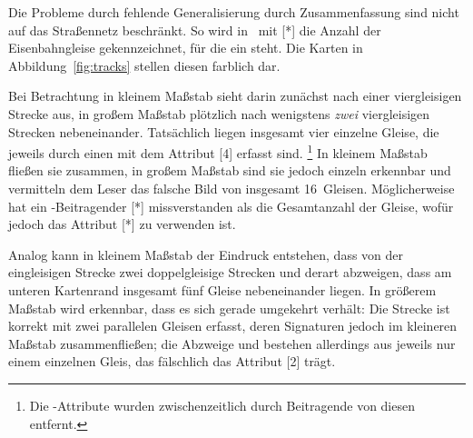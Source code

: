 \documentclass[../main/thesis.tex]{subfiles}
\begin{document}
\label{railway-case}

Die Probleme durch fehlende Generalisierung durch Zusammenfassung sind nicht auf das Straßennetz beschränkt.
So wird in \osm\ mit [*] die Anzahl der Eisenbahngleise gekennzeichnet, für die ein  steht.
Die Karten in Abbildung~\ref{fig:tracks} stellen diesen  farblich dar.

Bei Betrachtung in kleinem Maßstab sieht darin  zunächst nach einer viergleisigen Strecke aus, in großem Maßstab plötzlich nach wenigstens \emph{zwei} viergleisigen Strecken nebeneinander.
Tatsächlich liegen insgesamt vier einzelne Gleise, die jeweils durch einen  mit dem Attribut [4] erfasst sind.%
\footnote{Die -Attribute wurden zwischenzeitlich durch Beitragende von diesen  entfernt.}
In kleinem Maßstab fließen sie zusammen, in großem Maßstab sind sie jedoch einzeln erkennbar und vermitteln dem Leser das falsche Bild von insgesamt 16~Gleisen.
Möglicherweise hat ein \osm-Beitragender [*] missverstanden als die Gesamtanzahl der Gleise,  wofür jedoch das Attribut [*] zu verwenden ist.



Analog kann in kleinem Maßstab der Eindruck entstehen, dass von der eingleisigen Strecke  zwei doppelgleisige Strecken  und  derart abzweigen, dass am unteren Kartenrand insgesamt fünf Gleise nebeneinander liegen.
In größerem Maßstab wird erkennbar, dass es sich gerade umgekehrt verhält:
Die Strecke  ist korrekt mit zwei parallelen Gleisen erfasst, deren Signaturen jedoch im kleineren Maßstab zusammenfließen;
die Abzweige  und  bestehen allerdings aus jeweils nur einem einzelnen Gleis, das fälschlich das Attribut [2] trägt.
\end{document}
